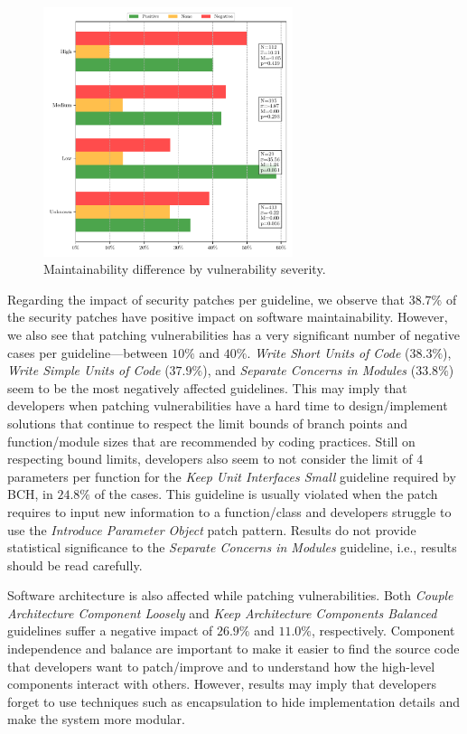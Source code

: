 \documentclass[smallextended]{svjour3}       %
\begin{document}
 \begin{figure}[htp]
  	\centering 	 	\includegraphics[width=0.65\textwidth]{figures/main_per_severity.pdf}
  	\caption{Maintainability difference by vulnerability severity.}
 	\label{fig:severity}
 \end{figure}

Regarding the impact of security patches per guideline, we 
observe that $38.7\%$ of the security patches have positive impact
on software maintainability. However, we also 
see that patching vulnerabilities has a very significant number of 
negative cases per guideline---between $10\%$ and $40\%$. 
\emph{Write Short Units of Code} ($38.3\%$), \emph{Write Simple 
Units of Code} ($37.9\%$), and \emph{Separate Concerns in Modules} 
($33.8\%$) seem to be the most negatively affected guidelines. This 
may imply that developers when patching vulnerabilities have a hard 
time to design/implement solutions that continue to respect the 
limit bounds of branch points and function/module sizes that are 
recommended by coding practices. Still on respecting bound limits, 
developers also seem to not consider the limit of $4$ parameters per 
function for the \emph{Keep Unit Interfaces Small} guideline 
required by BCH, in $24.8\%$ of the cases. This guideline is usually
violated when the patch requires to input new information to a 
function/class and developers struggle to use the \emph{Introduce 
Parameter Object} patch pattern. Results do not provide statistical 
significance to the \emph{Separate Concerns in Modules} guideline, 
i.e., results should be read carefully. 

Software architecture is also affected while patching 
vulnerabilities. Both \emph{Couple Architecture Component Loosely} 
and \emph{Keep Architecture Components Balanced} guidelines suffer a 
negative impact of $26.9\%$ and $11.0\%$, respectively. Component 
independence and balance are important to make it easier to find the 
source code that developers want to patch/improve and to understand 
how the high-level components interact with others. However, results 
may imply that developers forget to use techniques such as 
encapsulation to hide implementation details and make the system 
more modular.
\end{document}
